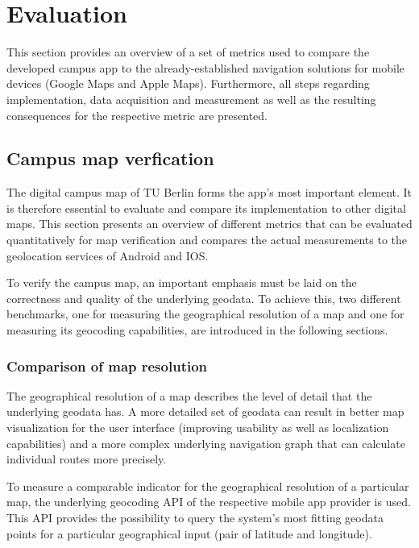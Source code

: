 \chapter{Evaluation}
\label{cha:evaluation}
This section provides an overview of a set of metrics used to compare the developed campus app to the already-established navigation solutions for mobile devices (Google Maps and Apple Maps). Furthermore, all steps regarding implementation, data acquisition and measurement as well as the resulting consequences for the respective metric are presented.

\section{Campus map verfication} \label{sec:campus_map_verification}
The digital campus map of TU Berlin forms the app's most important element. It is therefore essential to evaluate and compare its implementation to other digital maps. This section presents an overview of different metrics that can be evaluated quantitatively for map verification and compares the actual measurements to the geolocation services of Android and IOS.

To verify the campus map, an important emphasis must be laid on the correctness and quality of the underlying geodata. To achieve this, two different benchmarks, one for measuring the geographical resolution of a map and one for measuring its geocoding capabilities, are introduced in the following sections.


\subsection{Comparison of map resolution}
The geographical resolution of a map describes the level of detail that the underlying geodata has. A more detailed set of geodata can result in better map visualization for the user interface (improving usability as well as localization capabilities) and a more complex underlying navigation graph that can calculate individual routes more precisely.

To measure a comparable indicator for the geographical resolution of a particular map, the underlying geocoding API of the respective mobile app provider is used. This API provides the possibility to query the system's most fitting geodata points for a particular geographical input (pair of latitude and longitude).

